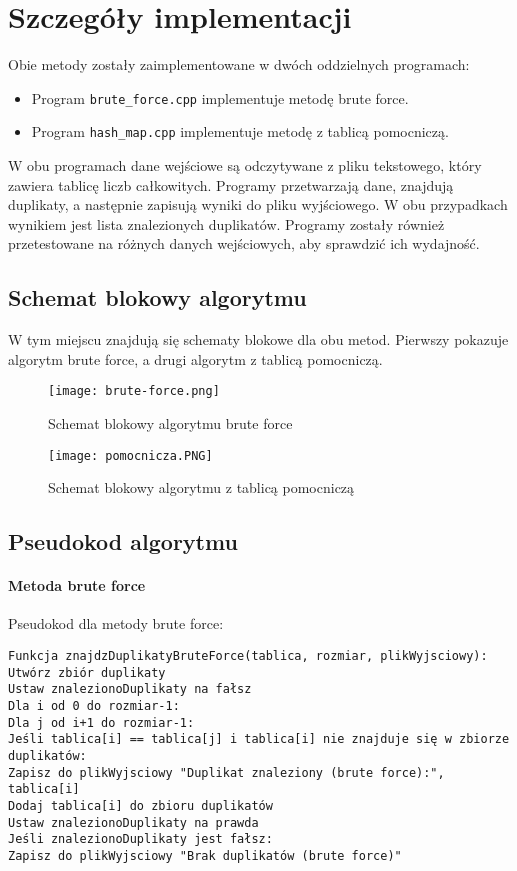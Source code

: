 \documentclass[a4paper,12pt]{article}
\begin{document}
\section{Szczegóły implementacji}
Obie metody zostały zaimplementowane w dwóch oddzielnych programach:
\begin{itemize}
    \item Program \texttt{brute\_force.cpp} implementuje metodę brute force.
    \item Program \texttt{hash\_map.cpp} implementuje metodę z tablicą pomocniczą.
\end{itemize}

W obu programach dane wejściowe są odczytywane z pliku tekstowego, który zawiera tablicę liczb całkowitych. Programy przetwarzają dane, znajdują duplikaty, a następnie zapisują wyniki do pliku wyjściowego. W obu przypadkach wynikiem jest lista znalezionych duplikatów. Programy zostały również przetestowane na różnych danych wejściowych, aby sprawdzić ich wydajność.

\newpage


\subsection{Schemat blokowy algorytmu}
W tym miejscu znajdują się schematy blokowe dla obu metod. Pierwszy pokazuje algorytm brute force, a drugi algorytm z tablicą pomocniczą.

\begin{figure}[H]
    \centering
    \texttt{[image: brute-force.png]}
    \caption{Schemat blokowy algorytmu brute force}
    \label{fig:schemat_bruteforce}
\end{figure}

\begin{figure}[H]
    \centering
    \texttt{[image: pomocnicza.PNG]}
    \caption{Schemat blokowy algorytmu z tablicą pomocniczą}
    \label{fig:schemat_hashmap}
\end{figure}

\subsection{Pseudokod algorytmu}

\paragraph{Metoda brute force}
Pseudokod dla metody brute force:
\begin{verbatim}
Funkcja znajdzDuplikatyBruteForce(tablica, rozmiar, plikWyjsciowy):
Utwórz zbiór duplikaty
Ustaw znalezionoDuplikaty na fałsz
Dla i od 0 do rozmiar-1:
Dla j od i+1 do rozmiar-1:
Jeśli tablica[i] == tablica[j] i tablica[i] nie znajduje się w zbiorze duplikatów:
Zapisz do plikWyjsciowy "Duplikat znaleziony (brute force):", tablica[i]
Dodaj tablica[i] do zbioru duplikatów
Ustaw znalezionoDuplikaty na prawda
Jeśli znalezionoDuplikaty jest fałsz:
Zapisz do plikWyjsciowy "Brak duplikatów (brute force)"
\end{verbatim}
\end{document}

